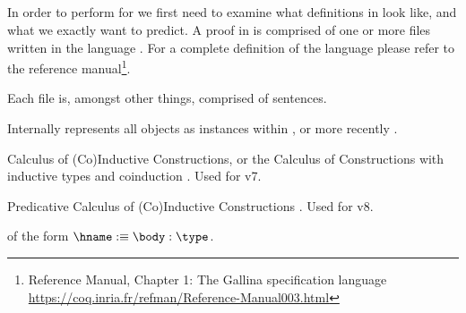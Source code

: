 
\subsection{\coq}

In order to perform \premiseselection for \coq we first need to examine what definitions in \coq look like, and what we exactly want to predict.
A proof in \coq is comprised of one or more files written in the \gallina language \cite{huet1992gallina} .
For a complete definition of the \gallina language please refer to the \coq reference manual\footnote{\coq Reference Manual, Chapter 1: The Gallina specification language\\ \url{https://coq.inria.fr/refman/Reference-Manual003.html}}.

Each file is, amongst other things, comprised of sentences.

Internally \coq represents all objects as instances within \cic, or more recently \pcic.

\begin{definition}[\cic]
	Calculus of (Co)Inductive Constructions,
	or the Calculus of Constructions \cite{coquand1988calculus} with inductive types and coinduction \cite{huet1987induction} \cite{coquand1990inductively}.
	Used for \coq v7.
\end{definition}

\begin{definition}[\pcic]
	Predicative Calculus of (Co)Inductive Constructions \cite{bertot2013interactive}.
	Used for \coq v8.
\end{definition}

\begin{definition}[{\coqobj[s]}]
	\coqobj[s] of the form $\hname :\equiv \body : \type$.
\end{definition}


